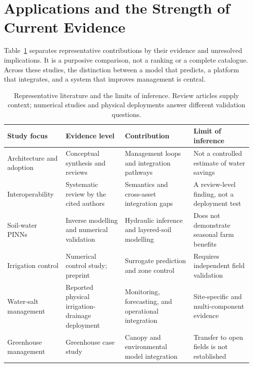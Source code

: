 \documentclass[11pt,a4paper]{article}
\begin{document}
\section{Applications and the Strength of Current Evidence}

\label{sec:7}

Table~\ref{tab:1} separates representative contributions by their evidence and unresolved implications. It is a purposive comparison, not a ranking or a complete catalogue. Across these studies, the distinction between a model that predicts, a platform that integrates, and a system that improves management is central.

\begin{table}[!htbp]
\centering
\small
\renewcommand{\arraystretch}{1.25}
\begin{tabular}{>{\raggedright\arraybackslash}p{}>{\raggedright\arraybackslash}p{}>{\raggedright\arraybackslash}p{}>{\raggedright\arraybackslash}p{}}
\toprule
\textbf{Study focus} & \textbf{Evidence level} & \textbf{Contribution} & \textbf{Limit of inference} \\
\midrule
Architecture and adoption \cite{R01,R02,R03} & Conceptual synthesis and reviews & Management loops and integration pathways & Not a controlled estimate of water savings \\[3pt]
Interoperability \cite{R04} & Systematic review by the cited authors & Semantics and cross-asset integration gaps & A review-level finding, not a deployment test \\[3pt]
Soil-water PINNs \cite{R15,R16} & Inverse modelling and numerical validation & Hydraulic inference and layered-soil modelling & Does not demonstrate seasonal farm benefits \\[3pt]
Irrigation control \cite{R18} & Numerical control study; preprint & Surrogate prediction and zone control & Requires independent field validation \\[3pt]
Water-salt management \cite{R19} & Reported physical irrigation-drainage deployment & Monitoring, forecasting, and operational integration & Site-specific and multi-component evidence \\[3pt]
Greenhouse management \cite{R20} & Greenhouse case study & Canopy and environmental model integration & Transfer to open fields is not established \\[3pt]
\bottomrule
\end{tabular}
\caption{Representative literature and the limits of inference. Review articles supply context; numerical studies and physical deployments answer different validation questions.}
\label{tab:1}
\end{table}
\end{document}
